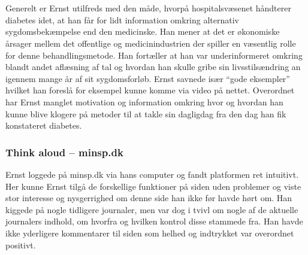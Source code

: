 \\ \\
Generelt er Ernst utilfreds med den måde, hvorpå hospitalsvæsenet håndterer diabetes idet, at han får for lidt information omkring alternativ sygdomsbekæmpelse end den medicinske. Han mener at det er økonomiske årsager mellem det offentlige og medicinindustrien der spiller en væsentlig rolle for denne behandlingsmetode. Han fortæller at han var underinformeret omkring blandt andet aflæsning af tal og hvordan han skulle gribe sin livsstilsændring an igennem mange år af sit sygdomsforløb. Ernst savnede især “gode eksempler” hvilket han foreslå for eksempel kunne komme via video på nettet. Overordnet har Ernst manglet motivation og information omkring hvor og hvordan han kunne blive klogere på metoder til at takle sin dagligdag fra den dag han fik konstateret diabetes.

\subsubsection*{Think aloud – minsp.dk} 
Ernst loggede på minsp.dk via hans computer og fandt platformen ret intuitivt. Her kunne Ernst tilgå de forskellige funktioner på siden uden problemer og viste stor interesse og nysgerrighed om denne side han ikke før havde hørt om. Han kiggede på nogle tidligere journaler, men var dog i tvivl om nogle af de aktuelle journalers indhold, om hvorfra og hvilken kontrol disse stammede fra. Han havde ikke yderligere kommentarer til siden som helhed og indtrykket var overordnet positivt.